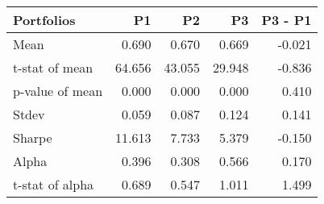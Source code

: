 \begin{tabular}{lrrrr}
\toprule
Portfolios & P1 & P2 & P3 & P3 - P1 \\
\midrule
Mean & 0.690 & 0.670 & 0.669 & -0.021 \\
t-stat of mean & 64.656 & 43.055 & 29.948 & -0.836 \\
p-value of mean & 0.000 & 0.000 & 0.000 & 0.410 \\
Stdev & 0.059 & 0.087 & 0.124 & 0.141 \\
Sharpe & 11.613 & 7.733 & 5.379 & -0.150 \\
Alpha & 0.396 & 0.308 & 0.566 & 0.170 \\
t-stat of alpha & 0.689 & 0.547 & 1.011 & 1.499 \\
\bottomrule
\end{tabular}
